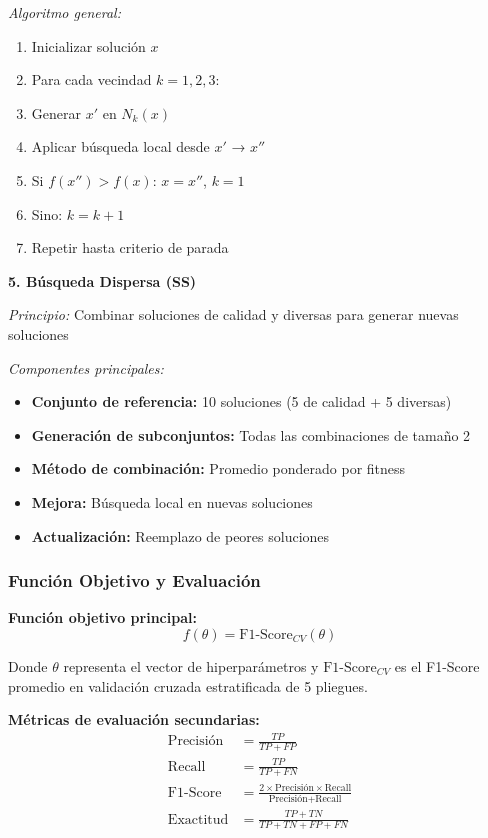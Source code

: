 \textit{Algoritmo general:}
\begin{enumerate}
    \item Inicializar solución $x$
    \item Para cada vecindad $k = 1, 2, 3$:
    \item \quad Generar $x'$ en $N_k(x)$
    \item \quad Aplicar búsqueda local desde $x'$ → $x''$
    \item \quad Si $f(x'') > f(x)$: $x = x''$, $k = 1$
    \item \quad Sino: $k = k + 1$
    \item Repetir hasta criterio de parada
\end{enumerate}

\textbf{5. Búsqueda Dispersa (SS)}

\textit{Principio:} Combinar soluciones de calidad y diversas para generar nuevas soluciones

\textit{Componentes principales:}
\begin{itemize}
    \item \textbf{Conjunto de referencia:} 10 soluciones (5 de calidad + 5 diversas)
    \item \textbf{Generación de subconjuntos:} Todas las combinaciones de tamaño 2
    \item \textbf{Método de combinación:} Promedio ponderado por fitness
    \item \textbf{Mejora:} Búsqueda local en nuevas soluciones
    \item \textbf{Actualización:} Reemplazo de peores soluciones
\end{itemize}

\subsubsection{Función Objetivo y Evaluación}

\textbf{Función objetivo principal:}
\begin{equation}
f(\theta) = \text{F1-Score}_{CV}(\theta)
\end{equation}

Donde $\theta$ representa el vector de hiperparámetros y $\text{F1-Score}_{CV}$ es el F1-Score promedio en validación cruzada estratificada de 5 pliegues.

\textbf{Métricas de evaluación secundarias:}
\begin{align}
\text{Precisión} &= \frac{TP}{TP + FP} \\
\text{Recall} &= \frac{TP}{TP + FN} \\
\text{F1-Score} &= \frac{2 \times \text{Precisión} \times \text{Recall}}{\text{Precisión} + \text{Recall}} \\
\text{Exactitud} &= \frac{TP + TN}{TP + TN + FP + FN}
\end{align}

